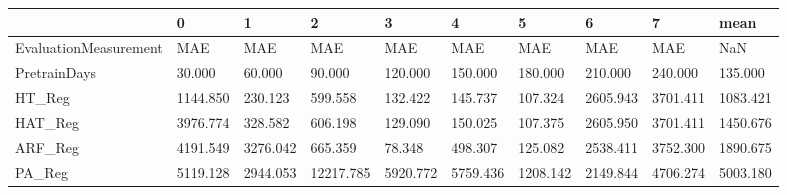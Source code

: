 \begin{tabular}{llllllllll}
\toprule
{} &        0 &        1 &         2 &        3 &        4 &        5 &        6 &        7 &     mean \\
\midrule
EvaluationMeasurement &      MAE &      MAE &       MAE &      MAE &      MAE &      MAE &      MAE &      MAE &      NaN \\
PretrainDays          &   30.000 &   60.000 &    90.000 &  120.000 &  150.000 &  180.000 &  210.000 &  240.000 &  135.000 \\
HT\_Reg                & 1144.850 &  230.123 &   599.558 &  132.422 &  145.737 &  107.324 & 2605.943 & 3701.411 & 1083.421 \\
HAT\_Reg               & 3976.774 &  328.582 &   606.198 &  129.090 &  150.025 &  107.375 & 2605.950 & 3701.411 & 1450.676 \\
ARF\_Reg               & 4191.549 & 3276.042 &   665.359 &   78.348 &  498.307 &  125.082 & 2538.411 & 3752.300 & 1890.675 \\
PA\_Reg                & 5119.128 & 2944.053 & 12217.785 & 5920.772 & 5759.436 & 1208.142 & 2149.844 & 4706.274 & 5003.180 \\
\bottomrule
\end{tabular}
